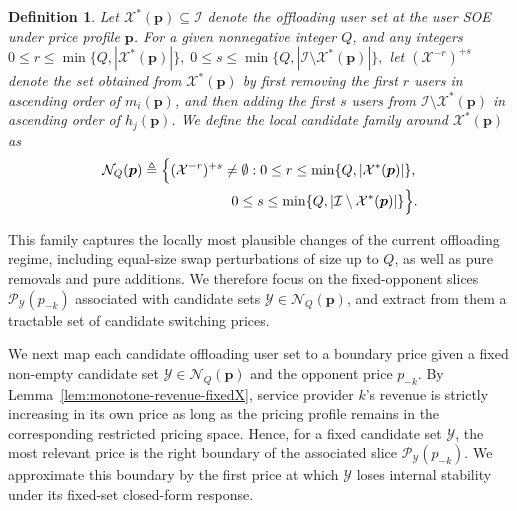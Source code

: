 \documentclass[lettersize,journal]{IEEEtran}
\newtheorem{definition}{Definition}
\begin{document}
\begin{definition}
\label{def:local-candidate-family}
Let $\mathcal{X}^*(\boldsymbol{p})\subseteq\mathcal{I}$ denote the offloading user set at the user SOE under price profile $\boldsymbol{p}$. For a given nonnegative integer $Q$, and any integers
\(
0\le r\le \min\{Q,|\mathcal{X}^*(\boldsymbol{p})|\},
\;
0\le s\le \min\{Q,|\mathcal{I}\setminus\mathcal{X}^*(\boldsymbol{p})|\},
\)
let $(\mathcal{X}^{-r})^{+s}$ denote the set obtained from $\mathcal{X}^*(\boldsymbol{p})$ by first removing the first $r$ users in ascending order of $m_i(\boldsymbol{p})$, and then adding the first $s$ users from $\mathcal{I}\setminus\mathcal{X}^*(\boldsymbol{p})$ in ascending order of $h_j(\boldsymbol{p})$. We define the local candidate family around $\mathcal{X}^*(\boldsymbol{p})$ as
\begin{equation}\label{eq:local-candidate-family}
\begin{split}
    \mathcal{N}_{Q}(\boldsymbol{p})
\triangleq
\Bigl\{
(\mathcal{X}^{-r})^{+s}\neq\emptyset:
0\le r\le \min\{Q,|\mathcal{X}^*(\boldsymbol{p})|\},\,\\
0\le s\le \min\{Q,|\mathcal{I}\setminus\mathcal{X}^*(\boldsymbol{p})|\}
\Bigr\}.
\end{split}
\end{equation}
\end{definition}

This family captures the locally most plausible changes of the current offloading regime, including equal-size swap perturbations of size up to $Q$, as well as pure removals and pure additions. We therefore focus on the fixed-opponent slices $\mathcal{P}_{\mathcal{Y}}(p_{-k})$ associated with candidate sets $\mathcal{Y}\in\mathcal{N}_Q(\boldsymbol{p})$, and extract from them a tractable set of candidate switching prices.

We next map each candidate offloading user set to a boundary price given a fixed non-empty candidate set $\mathcal Y\in\mathcal N_Q(\boldsymbol p)$ and the opponent price $p_{-k}$. By Lemma~\ref{lem:monotone-revenue-fixedX}, service provider $k$'s revenue is strictly increasing in its own price as long as the pricing profile remains in the corresponding restricted pricing space. Hence, for a fixed candidate set $\mathcal Y$, the most relevant price is the right boundary of the associated slice $\mathcal P_{\mathcal Y}(p_{-k})$. We approximate this boundary by the first price at which $\mathcal Y$ loses internal stability under its fixed-set closed-form response.
\end{document}

